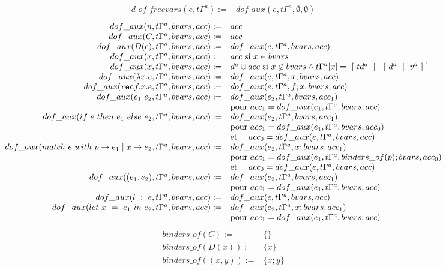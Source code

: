 \documentclass{article}
\newcommand\letin[3]{let\ #1\ =\ #2\ in\ #3}
\newcommand\exprifthenelse[3]{if\ #1\ then\ #2\ else\ #3}
\newcommand\match[5]{match\ #1\ with\ #2 \rightarrow #3 \mid #4 \rightarrow #5}
\newcommand\annot[2]{#1\ :\ #2}
\newcommand\rec[3]{{\tt rec} #1.#2.#3}
\newcommand\atval[2]{\ [\ #1\ \mid\ #2\ ]}
\newcommand\aval[2]{\ [\ #1\ \mid\ #2\ ]}
\begin{document}
{\scriptsize
$$
\begin{array}{rl}
d\_of\_freevars(e, t\Gamma^{a}) := & dof\_aux(e, t\Gamma^{a}, \emptyset, \emptyset)
\end{array}
$$
$$
\begin{array}{rl}
dof\_aux(n, t\Gamma^{a}, bvars, acc) := & acc\\
dof\_aux(C, t\Gamma^{a}, bvars, acc) := & acc\\
dof\_aux(D(e), t\Gamma^{a}, bvars, acc) := & dof\_aux(e, t\Gamma^{a}, bvars, acc)\\
dof\_aux(x, t\Gamma^{a}, bvars, acc) := & acc \mbox{ si } x \in bvars\\
dof\_aux(x, t\Gamma^{a}, bvars, acc) := & d^{a} \cup acc \mbox{ si } x \not \in bvars \wedge t\Gamma^{a}[x] = \atval{td^{a}}{\aval{d^{a}}{v^{a}}}\\
dof\_aux(\lambda x.e, t\Gamma^{a}, bvars, acc) := & dof\_aux(e, t\Gamma^{a}, x; bvars, acc)\\
dof\_aux(\rec{f}{x}{e}, t\Gamma^{a}, bvars, acc) := & dof\_aux(e, t\Gamma^{a}, f; x; bvars, acc)\\
dof\_aux(e_1\ e_2, t\Gamma^{a}, bvars, acc) := & dof\_aux(e_2, t\Gamma^{a}, bvars, acc_1)\\
& \mbox{pour } acc_1 = dof\_aux(e_1, t\Gamma^{a}, bvars, acc)\\
dof\_aux(\exprifthenelse{e}{e_1}{e_2}, t\Gamma^{a}, bvars, acc) := & dof\_aux(e_2, t\Gamma^{a}, bvars, acc_1)\\
& \mbox{pour } acc_1 = dof\_aux(e_1, t\Gamma^{a}, bvars, acc_0)\\
& \mbox{et\ \ \ \ } acc_0 = dof\_aux(e, t\Gamma^{a}, bvars, acc)\\
dof\_aux(\match{e}{p}{e_1}{x}{e_2}, t\Gamma^{a}, bvars, acc) := & dof\_aux(e_2, t\Gamma^{a}, x; bvars, acc_1)\\
& \mbox{pour } acc_1 = dof\_aux(e_1, t\Gamma^{a}, binders\_of(p); bvars, acc_0)\\
& \mbox{et\ \ \ \ } acc_0 = dof\_aux(e, t\Gamma^{a}, bvars, acc)\\
dof\_aux((e_1, e_2), t\Gamma^{a}, bvars, acc) := & dof\_aux(e_2, t\Gamma^{a}, bvars, acc_1)\\
& \mbox{pour } acc_1 = dof\_aux(e_1, t\Gamma^{a}, bvars, acc)\\
dof\_aux(\annot{l}{e}, t\Gamma^{a}, bvars, acc) := & dof\_aux(e, t\Gamma^{a}, bvars, acc)\\
dof\_aux(\letin{x}{e_1}{e_2}, t\Gamma^{a}, bvars, acc) := & dof\_aux(e_2, t\Gamma^{a}, x; bvars, acc_1)\\
& \mbox{pour } acc_1 = dof\_aux(e_1, t\Gamma^{a}, bvars, acc)\\
\end{array}
$$
$$
\begin{array}{rl}
binders\_of(C) := & \{\}\\
binders\_of(D(x)) := & \{x\}\\
binders\_of((x,y)) := & \{x; y\}\\
\end{array}
$$
}%
\end{document}
